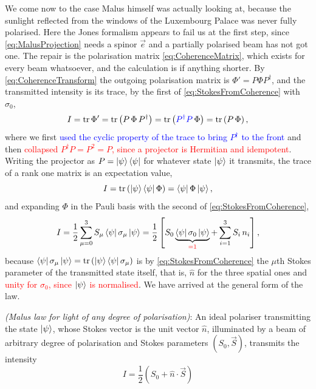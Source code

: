             We come now to the case Malus himself was actually looking at, because the sunlight reflected from the windows of the Luxembourg Palace was never fully polarised. Here the Jones formalism appears to fail us at the first step, since \ref{eq:MalusProjection} needs a spinor $\vec{e}$ and a partially polarised beam has not got one. The repair is the polarisation matrix \ref{eq:CoherenceMatrix}, which exists for every beam whatsoever, and the calculation is if anything shorter. By \ref{eq:CoherenceTransform} the outgoing polarisation matrix is $\Phi'=P\Phi P^{\dagger}$, and the transmitted intensity is its trace, by the first of \ref{eq:StokesFromCoherence} with $\sigma_0$,
            \begin{equation}\label{eq:IntensityFromCoherence}
                I = \text{tr}\,\Phi' = \text{tr}\left(P\,\Phi\,P^{\dagger}\right) = \text{tr}\left(\textcolor{blue}{P^{\dagger}P}\,\Phi\right) = \text{tr}\left(P\,\Phi\right),
            \end{equation}
            where we first \textcolor{blue}{used the cyclic property of the trace to bring $P^{\dagger}$ to the front} and then \textcolor{red}{collapsed $P^{\dagger}P=P^2=P$, since a projector is Hermitian and idempotent}. Writing the projector as $P=\ket{\psi}\bra{\psi}$ for whatever state $\ket{\psi}$ it transmits, the trace of a rank one matrix is an expectation value,
            \begin{equation*}
                I = \text{tr}\left(\ket{\psi}\bra{\psi}\Phi\right) = \bra{\psi}\Phi\ket{\psi},
            \end{equation*}
            and expanding $\Phi$ in the Pauli basis with the second of \ref{eq:StokesFromCoherence},
            \begin{equation*}
                I = \frac{1}{2}\sum_{\mu=0}^{3}S_\mu\bra{\psi}\sigma_\mu\ket{\psi} = \frac{1}{2}\left[S_0\underbrace{\bra{\psi}\sigma_0\ket{\psi}}_{\textcolor{red}{=1}}+\sum_{i=1}^{3}S_i\,n_i\right],
            \end{equation*}
            because $\bra{\psi}\sigma_\mu\ket{\psi}=\text{tr}\left(\ket{\psi}\bra{\psi}\sigma_\mu\right)$ is by \ref{eq:StokesFromCoherence} the $\mu$th Stokes parameter of the transmitted state itself, that is, $\hat{n}$ for the three spatial ones and \textcolor{red}{unity for $\sigma_0$, since $\ket{\psi}$ is normalised}. We have arrived at the general form of the law.

            \begin{myteo}
                \textit{(Malus law for light of any degree of polarisation)}: An ideal polariser transmitting the state $\ket{\psi}$, whose Stokes vector is the unit vector $\hat{n}$, illuminated by a beam of arbitrary degree of polarisation and Stokes parameters $\left(S_0,\vec{S}\right)$, transmits the intensity
                \begin{equation}\label{eq:MalusGeneral}
                    \boxed{\;I = \frac{1}{2}\left(S_0+\hat{n}\cdot\vec{S}\right)\;}
                \end{equation}
            \end{myteo}

